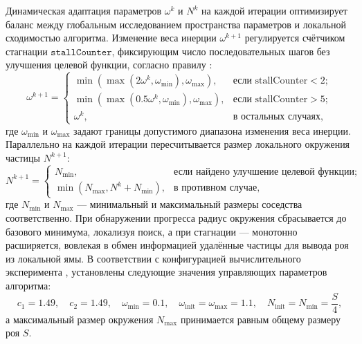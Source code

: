 Динамическая адаптация параметров $\omega^k$ и $N^k$ на каждой итерации оптимизирует баланс между глобальным исследованием пространства параметров и локальной сходимостью алгоритма. Изменение веса инерции $\omega^{k+1}$ регулируется счётчиком стагнации $\texttt{stallCounter}$, фиксирующим число последовательных шагов без улучшения целевой функции, согласно правилу \cite{Anastassi2025}:
\begin{equation*}
	\omega^{k+1} = 
	\begin{cases} 
		\min\left(\max(2\omega^k, \omega_{\min}), \omega_{\max}\right), & \text{если } \text{stallCounter} < 2; \\ 
		\min\left(\max(0.5\omega^k, \omega_{\min}), \omega_{\max}\right), & \text{если } \text{stallCounter} > 5; \\ 
		\omega^k, & \text{в остальных случаях,} 
	\end{cases}
\end{equation*}
где $\omega_{\min}$ и $\omega_{\max}$ задают границы допустимого диапазона изменения веса инерции. Параллельно на каждой итерации пересчитывается размер локального окружения частицы $N^{k+1}$:
\begin{equation*}
		N^{k+1} = 
		\begin{cases} 
			N_{\min}, & \text{если найдено улучшение целевой функции;} \\ 
			\min(N_{\max}, N^k + N_{\min}), & \text{в противном случае,} 
		\end{cases}
\end{equation*}
где $N_{\min}$ и $N_{\max}$ — минимальный и максимальный размеры соседства соответственно. При обнаружении прогресса радиус окружения сбрасывается до базового минимума, локализуя поиск, а при стагнации --- монотонно расширяется, вовлекая в обмен информацией удалённые частицы для вывода роя из локальной ямы. В соответствии с конфигурацией вычислительного эксперимента \cite{Anastassi2025}, установлены следующие значения управляющих параметров алгоритма:
\begin{equation*}
	c_1 = 1.49, \quad c_2 = 1.49, \quad \omega_{\min} = 0.1, \quad \omega_{\text{init}} = \omega_{\max} = 1.1, \quad N_{\text{init}} = N_{\min} = \frac{S}{4},
\end{equation*}
а максимальный размер окружения $N_{\max}$ принимается равным общему размеру роя $S$.